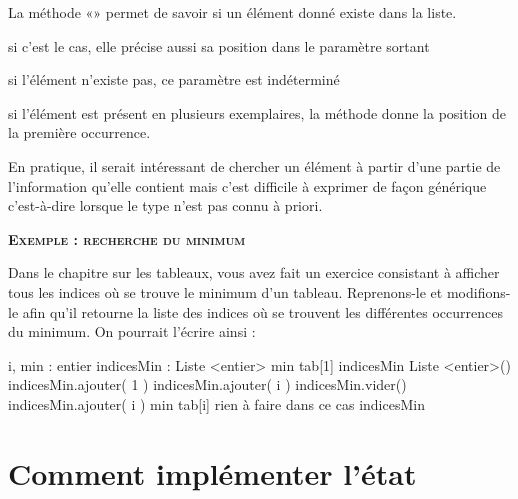 \begin{liste}
		La méthode «» permet de savoir si un élément
		donné existe dans la liste. 
		\begin{liste}
			\item 
				si c’est le cas, elle précise aussi sa position dans le paramètre sortant 
			\item 
				si l’élément n’existe pas, ce paramètre est	indéterminé 
			\item 
				si l’élément est présent en plusieurs exemplaires, la méthode donne la
				position de la première occurrence.
		\end{liste}
	\item 
		En pratique, il serait intéressant de chercher un élément à partir d’une
		partie de l’information qu’elle contient mais c’est difficile à
		exprimer de façon générique c'est-à-dire lorsque le
		type n'est pas connu à priori.
\end{liste}

\bigskip

{\sffamily\bfseries\scshape
Exemple : recherche du minimum}

Dans le chapitre sur les tableaux, vous avez fait un exercice consistant
à afficher tous les indices où se trouve le minimum d’un tableau.
Reprenons-le et modifions-le afin qu’il retourne la liste des indices
où se trouvent les différentes occurrences du minimum. On pourrait
l’écrire ainsi :

\begin{Pseudocode}
\footnotesize
		\Decl i, min : entier
		\Decl indicesMin : Liste <entier>
		\Let min \Gets tab[1]
		\Let indicesMin \Gets {} Liste <entier>()
		\Stmt indicesMin.ajouter( 1 )
			\Switch{} 
					\Stmt indicesMin.ajouter( i )
					\Stmt indicesMin.vider() 
					\Stmt indicesMin.ajouter( i )
					\Let min \Gets tab[i]
					\LComment rien à faire dans ce cas	
			\EndSwitch
		\EndFor
		\Return indicesMin
	\EndModule
\end{Pseudocode}

\bigskip

\section{Comment implémenter l’état}

